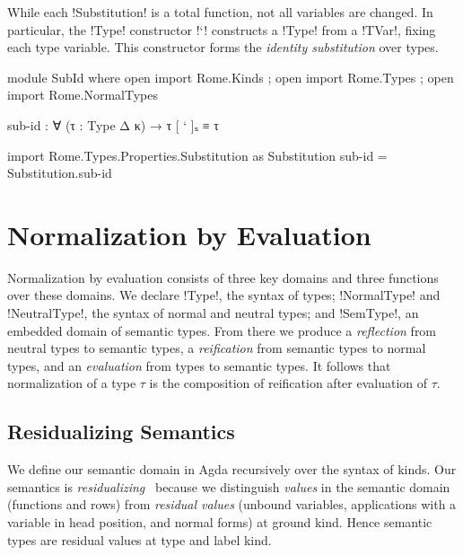 \Ni While each !Substitution! is a total function, not all variables are changed. In particular, the !Type! constructor !`! constructs a !Type! from a !TVar!, fixing each type variable. This constructor forms the \emph{identity substitution} over types.

\begin{code}[hide]
module SubId where
  open import Rome.Kinds ; open import Rome.Types ; open import Rome.NormalTypes
\end{code} 
\begin{code}
  sub-id : ∀ (τ : Type Δ κ) → τ [ ` ]ₛ ≡ τ
\end{code}
\begin{code}[hide]
  import Rome.Types.Properties.Substitution as Substitution
  sub-id = Substitution.sub-id
\end{code}


\section{Normalization by Evaluation}
\label{sec:NbE}

Normalization by evaluation consists of three key domains and three functions over these domains. We declare !Type!, the syntax of types; !NormalType! and !NeutralType!, the syntax of normal and neutral types; and !SemType!, an embedded domain of semantic types. From there we produce a \emph{reflection} from neutral types to semantic types, a \emph{reification} from semantic types to normal types, and an \emph{evaluation} from types to semantic types. It follows that normalization of a type $\tau$ is the composition of reification after evaluation of $\tau$.

\subsection{Residualizing Semantics}

We define our semantic domain in Agda recursively over the syntax of kinds. Our semantics is \emph{residualizing}~\citep{Lindley05} because we distinguish \emph{values} in the semantic domain (functions and rows) from \emph{residual values} (unbound variables, applications with a variable in head position, and normal forms) at ground kind. Hence semantic types are residual values at type and label kind.

